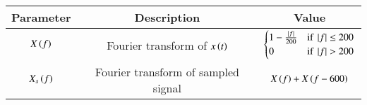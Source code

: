  \begin{tabular}{|c|c|c|}
        \hline
        \textbf{Parameter} & \textbf{Description} & \textbf{Value} \\
        \hline
        $X\left(f\right)$ & Fourier transform of $x\left(t\right)$ & $\begin{cases} 1 - \frac{\left\vert f\right\vert}{200} & \text{if } \left\vert f\right\vert \leq 200 \\ 0 & \text{if } \left\vert f\right\vert > 200 \end{cases} $  \\
        \hline
        $X_s\left(f\right)$ & Fourier transform of sampled signal & $X\left(f\right)+X\left(f-600\right)$\\
        \hline
        
    \end{tabular}


